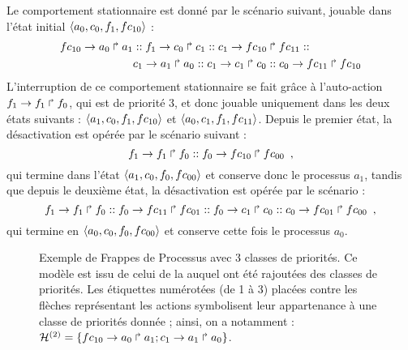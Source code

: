 \begin{example}
  Le comportement stationnaire est donné par le scénario suivant,
  jouable dans l'état initial $\mbox{$\langle a_0, c_0, f_1, fc_{10} \rangle$}$ :
  \begin{align*}
    fc_{10}\rightarrow a_0\Rsh a_1 &::
    f_1\rightarrow c_0\Rsh c_1 ::
    c_1\rightarrow fc_{10}\Rsh fc_{11} :: \\
    &c_1\rightarrow a_1\Rsh a_0 ::
    c_1\rightarrow c_1\Rsh c_0 ::
    c_0\rightarrow fc_{11}\Rsh fc_{10}
  \end{align*}
  L'interruption de ce comportement stationnaire se fait grâce à l'auto-action
  $f_1\rightarrow f_1\Rsh f_0$, qui est de priorité 3, et donc jouable uniquement
  dans les deux états suivants :
  $\mbox{$\langle a_1, c_0, f_1, fc_{10} \rangle$}$ et $\mbox{$\langle a_0, c_1, f_1, fc_{11} \rangle$}$.
  Depuis le premier état, la désactivation est opérée par le scénario suivant :
  \[
    f_1\rightarrow f_1\Rsh f_0 ::
    f_0\rightarrow fc_{10}\Rsh fc_{00}
    \enspace,
  \]
  qui termine dans l'état $\mbox{$\langle a_1, c_0, f_0, fc_{00} \rangle$}$ et conserve donc le processus $a_1$,
  tandis que depuis le deuxième état, la désactivation est opérée par le scénario :
  \[
    f_1\rightarrow f_1\Rsh f_0 ::
    f_0\rightarrow fc_{11}\Rsh fc_{01} ::
    f_0\rightarrow c_1\Rsh c_0 ::
    c_0\rightarrow fc_{01}\Rsh fc_{00}
    \enspace,
  \]
  qui termine en $\mbox{$\langle a_0, c_0, f_0, fc_{00} \rangle$}$ et conserve cette fois le processus $a_0$.
  
  \begin{figure}[ht]
  \begin{center}
  \caption{%
    Exemple de Frappes de Processus avec 3 classes de priorités.
    Ce modèle est issu de celui de la 
    auquel ont été rajoutées des classes de priorités.
    Les étiquettes numérotées (de 1 à 3) placées contre les flèches représentant les actions
    symbolisent leur appartenance à une classe de priorités donnée ;
    ainsi, on a notamment :
    $\mathcal{H}^{(2)} = \{ fc_{10}\rightarrow a_0\Rsh a_1 ; c_1\rightarrow a_1\Rsh a_0 \}$.
  }
  \end{center}
  \end{figure}
\end{example}



